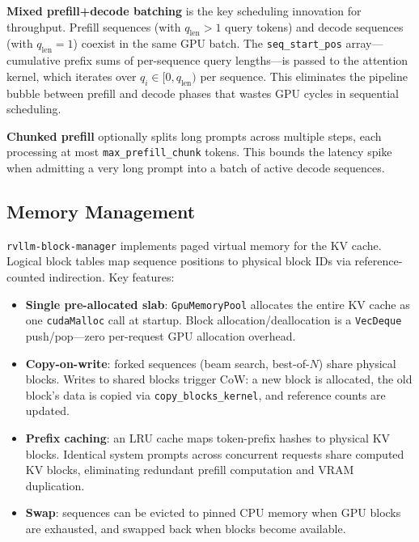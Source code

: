 \textbf{Mixed prefill+decode batching} is the key scheduling innovation for
throughput. Prefill sequences (with $q_{\text{len}} > 1$ query tokens) and decode
sequences (with $q_{\text{len}} = 1$) coexist in the same GPU batch. The
\texttt{seq\_start\_pos} array---cumulative prefix sums of per-sequence query
lengths---is passed to the attention kernel, which iterates over
$q_i \in [0, q_{\text{len}})$ per sequence. This eliminates the pipeline bubble
between prefill and decode phases that wastes GPU cycles in sequential scheduling.

\textbf{Chunked prefill} optionally splits long prompts across multiple steps,
each processing at most \texttt{max\_prefill\_chunk} tokens. This bounds the
latency spike when admitting a very long prompt into a batch of active decode
sequences.

\subsection{Memory Management}

\texttt{rvllm-block-manager} implements paged virtual memory for the KV cache.
Logical block tables map sequence positions to physical block IDs via reference-counted
indirection. Key features:

\begin{itemize}
  \item \textbf{Single pre-allocated slab}: \texttt{GpuMemoryPool} allocates the
        entire KV cache as one \texttt{cudaMalloc} call at startup. Block
        allocation/deallocation is a \texttt{VecDeque} push/pop---zero per-request
        GPU allocation overhead.
  \item \textbf{Copy-on-write}: forked sequences (beam search, best-of-$N$) share
        physical blocks. Writes to shared blocks trigger CoW: a new block is allocated,
        the old block's data is copied via \texttt{copy\_blocks\_kernel}, and reference
        counts are updated.
  \item \textbf{Prefix caching}: an LRU cache maps token-prefix hashes to physical
        KV blocks. Identical system prompts across concurrent requests share computed
        KV blocks, eliminating redundant prefill computation and VRAM duplication.
  \item \textbf{Swap}: sequences can be evicted to pinned CPU memory when GPU blocks
        are exhausted, and swapped back when blocks become available.
\end{itemize}

